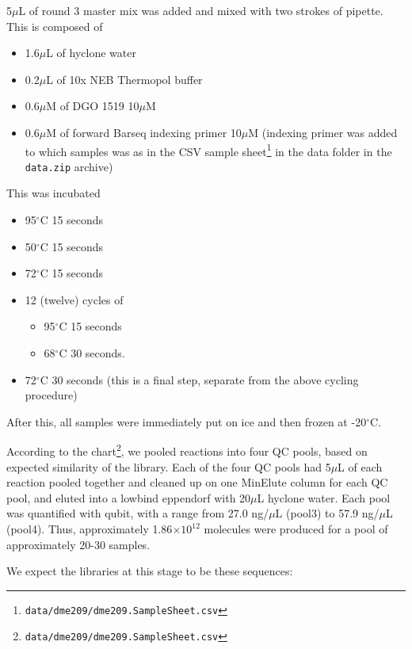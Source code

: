 {5\(\mu\)L of round 3 master mix was added and mixed with two strokes of
pipette. This is composed of

\begin{itemize}
\tightlist
\item
  1.6\(\mu\)L of hyclone water
\item
  0.2\(\mu\)L of 10x NEB Thermopol buffer
\item
  0.6\(\mu\)M of DGO 1519 10\(\mu\)M
\item
  0.6\(\mu\)M of forward Barseq indexing primer 10\(\mu\)M (indexing
  primer was added to which samples was as in the CSV sample
  sheet\footnote{\texttt{data/dme209/dme209.SampleSheet.csv}} in the
  data folder in the \texttt{data.zip} archive)
\end{itemize}

This was incubated

\begin{itemize}
\tightlist
\item
  95\(^{\circ}\)C 15 seconds
\item
  50\(^{\circ}\)C 15 seconds
\item
  72\(^{\circ}\)C 15 seconds
\item
  12 (twelve) cycles of

  \begin{itemize}
  \tightlist
  \item
    95\(^{\circ}\)C 15 seconds
  \item
    68\(^{\circ}\)C 30 seconds.
  \end{itemize}
\item
  72\(^{\circ}\)C 30 seconds (this is a final step, separate from the
  above cycling procedure)
\end{itemize}

After this, all samples were immediately put on ice and then frozen at
-20\(^{\circ}\)C.

According to the chart\footnote{\texttt{data/dme209/dme209.SampleSheet.csv}},
we pooled reactions into four QC pools, based on expected similarity of
the library. Each of the four QC pools had 5\(\mu\)L of each reaction
pooled together and cleaned up on one MinElute column for each QC pool,
and eluted into a lowbind eppendorf with 20\(\mu\)L hyclone water. Each
pool was quantified with qubit, with a range from 27.0 ng/\(\mu\)L
(pool3) to 57.9 ng/\(\mu\)L (pool4). Thus, approximately
1.86\(\times 10^{12}\) molecules were produced for a pool of
approximately 20-30 samples.

We expect the libraries at this stage to be these sequences:

}
